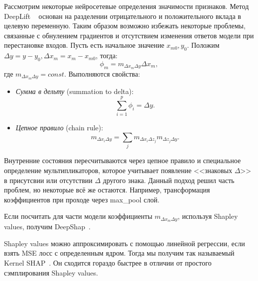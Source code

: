 \documentclass[12pt]{article}
\begin{document}
Рассмотрим некоторые нейросетевые определения значимости признаков. Метод DeepLift ~\citep{deep_lift} основан на разделении отрицательного и положительного вклада в целевую переменную. Таким образом возможно избежать некоторые проблемы, связанные с обнулением градиентов и отсутствием изменения ответов модели при перестановке входов. Пусть есть начальное значение $x_{m0}, y_0$. Положим $\Delta y = y - y_0, \Delta x_m = x_m - x_{m0}$, тогда:
$$
\phi_{m}=m_{\Delta x_{m} \Delta y} \Delta x_{m},
$$
где $m_{\Delta x_{m} \Delta y} = const$.
Выполняются свойства:
\begin{itemize}[noitemsep]
    \item \emph{Сумма в дельту} (summation to delta): $$
    \sum_{i=1}^{p} \phi_{i}=\Delta y.$$
    \item \emph{Цепное правило} (chain rule): $$m_{\Delta x_{i} \Delta y}=\sum_{j} m_{\Delta x_{i} \Delta z_{j}} m_{\Delta z_{j} \Delta y}.$$
\end{itemize}
Внутренние состояния пересчитываются через цепное правило и специальное определение мультипликаторов, которое учитывает появление <<знаковых $\Delta$>> в присутсвии или отсутствии $\Delta$ другого знака. Данный подход решил часть проблем, но некоторые всё же остаются. Например, трансформация коэффициентов при проходе через max\_pool слой.

Если посчитать для части модели коэффициенты $m_{\Delta x_{m} \Delta y}$, используя Shapley values, получим DeepShap~\citep{deepshap}.

Shapley values можно аппроксимировать с помощью линейной регрессии, если взять MSE лосс с определенным ядром. Тогда мы получим так называемый Kernel SHAP~\citep{deepshap}. Он сходится гораздо быстрее в отличии от простого сэмплирования Shapley values.
\end{document}
